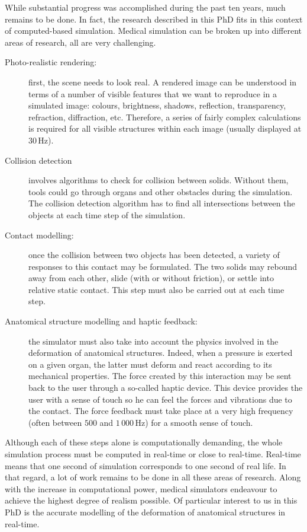 While substantial progress was accomplished during the past ten years, much remains to be done. In fact, the research described in this PhD fits in this context of computed-based simulation. Medical simulation can be broken up into different areas of research, all are very challenging.
%
\begin{description}
\item[Photo-realistic rendering:] first, the scene needs to look real. A rendered image can be understood in terms of a number of visible features that we want to reproduce in a simulated image: colours, brightness, shadows, reflection, transparency, refraction, diffraction, etc. Therefore, a series of fairly complex calculations is required for all visible structures within each image (usually displayed at $30\,$Hz). 
\item[Collision detection] involves algorithms to check for collision between solids. Without them, tools could go through organs and other obstacles during the simulation. The collision detection algorithm has to find all intersections between the objects at each time step of the simulation. 
\item[Contact modelling:] once the collision between two objects has been detected, a variety of responses to this contact may be formulated. The two solids may rebound away from each other, slide (with or without friction), or settle into relative static contact. This step must also be carried out at each time step. 
\item[Anatomical structure modelling and haptic feedback:] the simulator must also take into account the physics involved in the deformation of anatomical structures. Indeed, when a pressure is exerted on a given organ, the latter must deform and react according to its mechanical properties. The force created by this interaction may be sent back to the user through a so-called haptic device. This device provides the user with a sense of touch so he can feel the forces and vibrations due to the contact. The force feedback must take place at a very high frequency (often between $ 500 $ and $ 1\,000\,$Hz) for a smooth sense of touch. 
\end{description}
%
Although each of these steps alone is computationally demanding, the whole simulation process must be computed in real-time or close to real-time. Real-time means that one second of simulation corresponds to one second of real life. In that regard, a lot of work remains to be done in all these areas of research. Along with the increase in computational power, medical simulators endeavour to achieve the highest degree of realism possible. Of particular interest to us in this PhD is the accurate modelling of the deformation of anatomical structures in real-time. 

